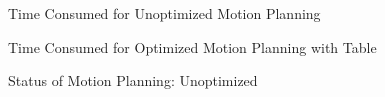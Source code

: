 \begin{figure}[!ht] %
	\centering
	\caption{Time Consumed for Unoptimized Motion Planning }
	\label{fig:bm1}
\end{figure}
\begin{figure}[!ht] %
	\centering
	\caption{Time Consumed for Optimized Motion Planning with Table}
	\label{fig:bm2}
\end{figure}
\begin{figure}[!ht] %
	\centering
	\caption{Status of Motion Planning: Unoptimized}
	\label{fig:bm3}
\end{figure}
